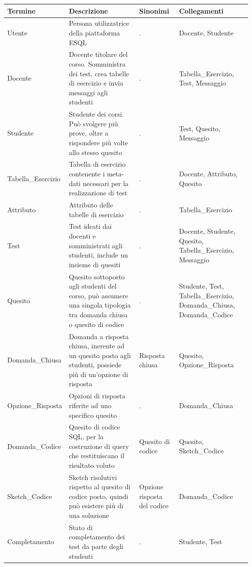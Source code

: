\documentclass{article}
\begin{document}
\begin{table}[H]
    \centering
       \begin{tabularx}{\textwidth}{|X|p{6cm}|X|X|}
        \hline
        \bf Termine & \bf Descrizione & \bf Sinonimi & \bf Collegamenti \\
        \hline
        Utente & Persona utilizzatrice della piattaforma ESQL & . & Docente, Studente \\
        \hline
        Docente & Docente titolare del corso. Somministra dei test, crea tabelle di esercizio e invia messaggi agli studenti & . & Tabella\_Esercizio, Test, Messaggio \\
        \hline
        Studente & Studente dei corsi. Può svolgere più prove, oltre a rispondere più volte allo stesso quesito & . & Test, Quesito, Messaggio \\
        \hline
        Tabella\_Esercizio & Tabella di esercizio contenente i meta-dati necessari per la realizzazione di test & . & Docente, Attributo, Quesito \\
        \hline
        Attributo & Attributo delle tabelle di esercizio & . & Tabella\_Esercizio \\
        \hline
        Test & Test ideati dai docenti e somministrati agli studenti, include un insieme di quesiti & . & Docente, Studente, Quesito, Tabella\_Esercizio, Messaggio \\
        \hline 
        Quesito & Quesito sottoposto agli studenti del corso, può assumere una singola tipologia tra domanda chiusa o quesito di codice & . & Studente, Test, Tabella\_Esercizio, Domanda\_Chiusa, Domanda\_Codice \\
        \hline
        Domanda\_Chiusa & Domanda a risposta chiusa, inerente ad un quesito posto agli studenti, possiede più di un'opzione di risposta & Risposta chiusa & Quesito, Opzione\_Risposta \\
        \hline
        Opzione\_Risposta & Opzioni di risposta riferite ad uno specifico quesito & . & Domanda\_Chiusa \\
        \hline
        Domanda\_Codice & Quesito di codice SQL, per la costruzione di query che restituiscano il risultato voluto & Quesito di codice & Quesito, Sketch\_Codice \\
        \hline
        Sketch\_Codice & Sketch risolutivi rispetto al quesito di codice posto, quindi può esistere più di una soluzione & Opzione risposta del codice & Domanda\_Codice \\
        \hline
        Completamento & Stato di completamento dei test da parte degli studenti & . & Studente, Test \\

\end{tabularx}
\end{table}
\end{document}
